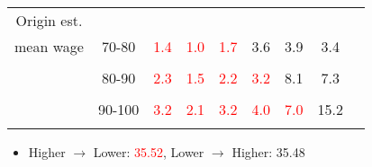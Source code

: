 \documentclass{beamer}
\begin{document}
{\begin{table}[t]
\begin{center}
\begin{tabular}{ccccccccc
        }
        Origin est.                                              &                                                &                      &                      &                      &                      &                      &          \\
        mean wage                                                & 70-80                                          & \textcolor{red}{1.4} & \textcolor{red}{1.0} & \textcolor{red}{1.7} & 3.6                  & 3.9                  & 3.4      \\
                                                                 &                                                &                      &                      &                      &                      &                      &          \\
                                                                 & 80-90                                          & \textcolor{red}{2.3} & \textcolor{red}{1.5} & \textcolor{red}{2.2} & \textcolor{red}{3.2} & 8.1                  & 7.3      \\
                                                                 &                                                &                      &                      &                      &                      &                      &          \\
                                                                 & 90-100                                         & \textcolor{red}{3.2} & \textcolor{red}{2.1} & \textcolor{red}{3.2} & \textcolor{red}{4.0} & \textcolor{red}{7.0} & 15.2     \\
        \\\hline
      \end{tabular}
    \end{center}
  \end{table}
  \begin{itemize}
    \item Higher $\rightarrow$ Lower: \textcolor{red}{35.52}, Lower $\rightarrow$ Higher: 35.48
  \end{itemize}
}
\end{document}
